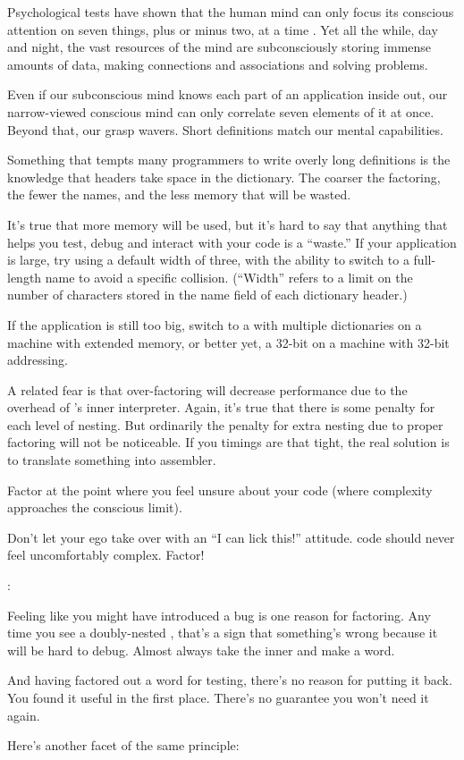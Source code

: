 Psychological tests have shown that the human mind can only focus its
conscious attention on seven things, plus or minus two, at a time
\cite{miller56}. Yet all the while, day and night, the vast resources
of the mind are subconsciously storing immense amounts of data, making
connections and associations and solving problems.

Even if our subconscious mind knows each part of an application inside
out, our narrow-viewed conscious mind can only correlate seven
elements of it at once. Beyond that, our grasp wavers. Short
definitions match our mental capabilities.

Something that tempts many \Forth{} programmers to write overly long
definitions is the knowledge that headers take space in the
dictionary. The coarser the factoring, the fewer the names, and the
less memory that will be wasted.

It's true that more memory will be used, but it's hard to say that
anything that helps you test, debug and interact with your code is a
``waste.'' If your application is large, try using a default width of
three, with the ability to switch to a full-length name to avoid a
specific collision. (``Width'' refers to a limit on the number of
characters stored in the name field of each dictionary header.)

If the application is still too big, switch to a \Forth{} with
multiple dictionaries on a machine with extended memory, or better
yet, a 32-bit \Forth{} on a machine with 32-bit addressing.

A related fear is that over-factoring will decrease performance due to
the overhead of \Forth{}'s inner interpreter. Again, it's true that
there is some penalty for each level of nesting. But ordinarily the
penalty for extra nesting due to proper factoring will not be
noticeable. If you timings are that tight, the real solution is to
translate something into assembler.

\begin{tip}
Factor at the point where you feel unsure about your code (where
complexity approaches the conscious limit).
\end{tip}
Don't let your ego take over with an ``I can lick this!'' attitude.
\Forth{} code should never feel uncomfortably complex. Factor!

\begin{interview}
:

\begin{tfquot}
Feeling like you might have introduced a bug is one reason for factoring.
Any time you see a doubly-nested , that's a sign
that something's wrong because it will be hard to debug. Almost always
take the inner  and make a word.

And having factored out a word for testing, there's no reason for
putting it back. You found it useful in the first place. There's no
guarantee you won't need it again.
\end{tfquot}
\end{interview}
Here's another facet of the same principle:

